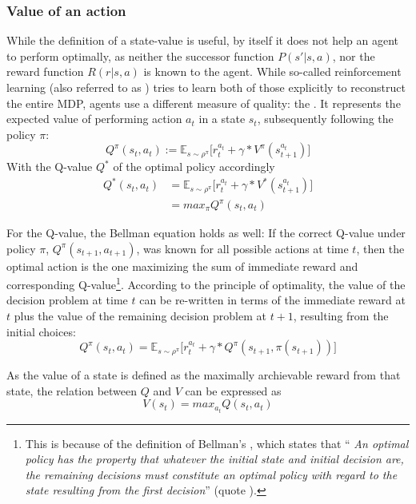 \subsubsection{Value of an action}
While the definition of a state-value is useful, by itself it does not help an agent to perform optimally, as neither the successor function $P(s'|s,a)$, nor the reward function $R(r|s,a)$ is known to the agent. While so-called  reinforcement learning (also referred to as ) tries to learn both of those explicitly to reconstruct the entire MDP,  agents use a different measure of quality: the . It represents the expected value of performing action $a_t$ in a state $s_t$, subsequently following the policy $\pi$:
\begin{equation} \label{eq:1.2}
	Q^\pi(s_t,a_t) :=  \mathds{E}_{s\sim\rho^\pi} \big[ r_t^{a_t} + \gamma * V^\pi(s_{t+1}^{a_t}) \big]
\end{equation}
With the Q-value $Q^*$ of the optimal policy accordingly 
\begin{align*}
	Q^*(s_t,a_t) &=  \mathds{E}_{s\sim\rho^\pi} \big[ r_t^{a_t} + \gamma * V^*(s_{t+1}^{a_t}) \big] \\
	&= max_\pi Q^\pi(s_t,a_t)
\end{align*}

For the Q-value, the Bellman equation holds as well: If the correct Q-value under policy $\pi$, $Q^\pi(s_{t+1},a_{t+1})$, was known for all possible actions at time $t$, then the optimal action is the one maximizing the sum of immediate reward and corresponding Q-value\footnote{This is because of the definition of Bellman's , which states that ``\kern-2pt \textit{An optimal policy has the property that whatever the initial state and initial decision are, the remaining decisions must constitute an optimal policy with regard to the state resulting from the first decision}''  (quote \cite{bellman_dynamic_nodate}).}. According to the principle of optimality, the value of the decision problem at time $t$ can be re-written in terms of the immediate reward at $t$ plus the value of the remaining decision problem at $t+1$, resulting from the initial choices:
\begin{equation} \label{bellman}
	Q^\pi(s_t,a_t) =  \mathds{E}_{s\sim\rho^\pi} \big[r_t^{a_t} + \gamma *  Q^\pi(s_{t+1},\pi(s_{t+1}))  \big]
\end{equation}

As the value of a state is defined as the maximally archievable reward from that state, the relation between $Q$ and $V$ can be expressed as
\begin{equation} \label{eq:QandV}
V(s_t) = max_{a_t} Q(s_t, a_t)
\end{equation}

